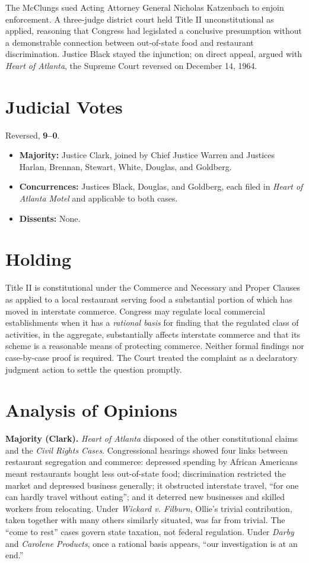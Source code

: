 \documentclass[12pt]{article}
\begin{document}
The McClungs sued Acting Attorney General Nicholas Katzenbach to enjoin enforcement. A three-judge district court held Title II unconstitutional as applied, reasoning that Congress had legislated a conclusive presumption without a demonstrable connection between out-of-state food and restaurant discrimination. Justice Black stayed the injunction; on direct appeal, argued with \textit{Heart of Atlanta}, the Supreme Court reversed on December 14, 1964.

\section{Judicial Votes}

Reversed, \textbf{9--0}.
\begin{itemize}
\item \textbf{Majority:} Justice Clark, joined by Chief Justice Warren and Justices Harlan, Brennan, Stewart, White, Douglas, and Goldberg.
\item \textbf{Concurrences:} Justices Black, Douglas, and Goldberg, each filed in \textit{Heart of Atlanta Motel} and applicable to both cases.
\item \textbf{Dissents:} None.
\end{itemize}

\section{Holding}

Title II is constitutional under the Commerce and Necessary and Proper Clauses as applied to a local restaurant serving food a substantial portion of which has moved in interstate commerce. Congress may regulate local commercial establishments when it has a \textit{rational basis} for finding that the regulated class of activities, in the aggregate, substantially affects interstate commerce and that its scheme is a reasonable means of protecting commerce. Neither formal findings nor case-by-case proof is required. The Court treated the complaint as a declaratory judgment action to settle the question promptly.

\section{Analysis of Opinions}

\textbf{Majority (Clark).} \textit{Heart of Atlanta} disposed of the other constitutional claims and the \textit{Civil Rights Cases}. Congressional hearings showed four links between restaurant segregation and commerce: depressed spending by African Americans meant restaurants bought less out-of-state food; discrimination restricted the market and depressed business generally; it obstructed interstate travel, ``for one can hardly travel without eating''; and it deterred new businesses and skilled workers from relocating. Under \textit{Wickard v. Filburn}, Ollie's trivial contribution, taken together with many others similarly situated, was far from trivial. The ``come to rest'' cases govern state taxation, not federal regulation. Under \textit{Darby} and \textit{Carolene Products}, once a rational basis appears, ``our investigation is at an end.''
\end{document}
